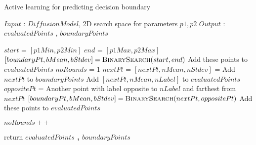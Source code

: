 



\begin{algorithm}

\caption{Active learning for predicting decision boundary}
\label{alg:methodAlgo}
\begin{algorithmic}[1]

\State $Input$ : $DiffusionModel$,
2D search space for parameters $p1,p2$ 
\State $Output$ : $evaluatedPoints$ , $boundaryPoints$

    \State $start$  = $[p1Min, p2Min]$
    \State $end$  = $[p1Max, p2Max]$
    \State $[boundaryPt, bMean, bStdev] = \Call{BinarySearch}{start,end}$
    \State {} Add these points to $evaluatedPoints$
    \State $noRounds$ = 1
        \State \textbf{\textit{$nextPt$}} = 
        \State $[nextPt, nMean, nStdev]$ = 
            \State Add $nextPt$ to $boundaryPoints$
        \Else 
            \State Add $[nextPt, nMean, nLabel]$ to $evaluatedPoints$
        \EndIf
        \State $oppositePt$ = Another point with label opposite to $nLabel$ and farthest from $nextPt$
        \State $[boundaryPt, bMean, bStdev] = \Call{BinarySearch}{nextPt,oppositePt}$
        \State {} Add these points to $evaluatedPoints$
        
        \State $noRounds++$
        
     \EndWhile
    
    \State return \textbf{$evaluatedPoints$ , $boundaryPoints$}

\EndProcedure
\end{algorithmic}
\end{algorithm}


